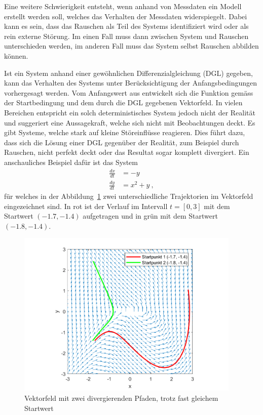 Eine weitere Schwierigkeit entsteht, wenn anhand von Messdaten ein Modell erstellt werden soll, welches das Verhalten der Messdaten widerspiegelt. Dabei kann es sein, dass das Rauschen als Teil des Systems identifiziert wird oder als rein externe Störung. Im einen Fall muss dann zwischen System und Rauschen unterschieden werden, im anderen Fall muss das System selbst Rauschen abbilden können.

Ist ein System anhand einer gewöhnlichen Differenzialgleichung (DGL) gegeben, kann das Verhalten des Systems unter Berücksichtigung der Anfangsbedingungen vorhergesagt werden. Vom Anfangswert aus entwickelt sich die Funktion gemäss der Startbedingung und dem durch die DGL gegebenen Vektorfeld. In vielen Bereichen entspricht ein solch deterministisches System jedoch nicht der Realität und suggeriert eine Aussagekraft, welche sich nicht mit Beobachtungen deckt. Es gibt Systeme, welche stark auf kleine Störeinflüsse reagieren. Dies führt dazu, dass sich die Lösung einer DGL gegenüber der Realität, zum Beispiel durch Rauschen, nicht perfekt deckt oder das Resultat sogar komplett divergiert. Ein anschauliches Beispiel dafür ist das System
\begin{align}
	\frac{dx}{dt} &= -y \\
	\frac{dy}{dt} &= x^2 + y
	\label{brown:divergentEquation} \ ,
\end{align}
für welches in der Abbildung~\ref{brown:divergentAndConvergentSystem} zwei unterschiedliche Trajektorien im Vektorfeld eingezeichnet sind. In rot ist der Verlauf im Intervall  $ t = [0, 3] $ mit dem Startwert $ (-1.7, -1.4) $ aufgetragen und in grün mit dem Startwert $ (-1.8, -1.4) $.

\begin{figure}
	\centering
	\includegraphics[width=0.95\textwidth]{papers/brown/images/divergentDGL.png}
	\caption{Vektorfeld mit zwei divergierenden Pfaden, trotz fast gleichem Startwert}
	\label{brown:divergentAndConvergentSystem}
\end{figure}

